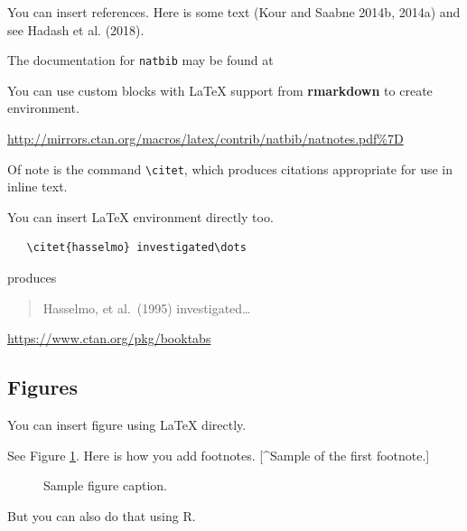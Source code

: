 \documentclass{article}
\newenvironment{Shaded}{\begin{snugshade}}{\end{snugshade}}
\newcommand{\FunctionTok}[1]{\textcolor[rgb]{0.13,0.29,0.53}{\textbf{#1}}}
\newcommand{\NormalTok}[1]{#1}
\newcommand{\SpecialCharTok}[1]{\textcolor[rgb]{0.81,0.36,0.00}{\textbf{#1}}}
\begin{document}
\label{sec:others}

You can insert references. Here is some text (Kour and Saabne 2014b,
2014a) and see Hadash et al. (2018).

The documentation for \verb+natbib+ may be found at

You can use custom blocks with LaTeX support from \textbf{rmarkdown} to
create environment.

\begin{center}
\url{http://mirrors.ctan.org/macros/latex/contrib/natbib/natnotes.pdf\%7D}

\end{center}

Of note is the command \verb+\citet+, which produces citations
appropriate for use in inline text.

You can insert LaTeX environment directly too.

\begin{verbatim}
   \citet{hasselmo} investigated\dots
\end{verbatim}

produces

\begin{quote}
  Hasselmo, et al.\ (1995) investigated\dots
\end{quote}

\begin{center}
  \url{https://www.ctan.org/pkg/booktabs}
\end{center}

\subsection{Figures}\label{figures}

You can insert figure using LaTeX directly.

See Figure \ref{fig:fig1}. Here is how you add footnotes. {[}\^{}Sample
of the first footnote.{]}

\begin{figure}
  \centering
  \fbox{\rule[-.5cm]{4cm}{4cm} \rule[-.5cm]{4cm}{0cm}}
  \caption{Sample figure caption.}
  \label{fig:fig1}
\end{figure}

But you can also do that using R.

\begin{Shaded}
\end{Shaded}
\end{document}
